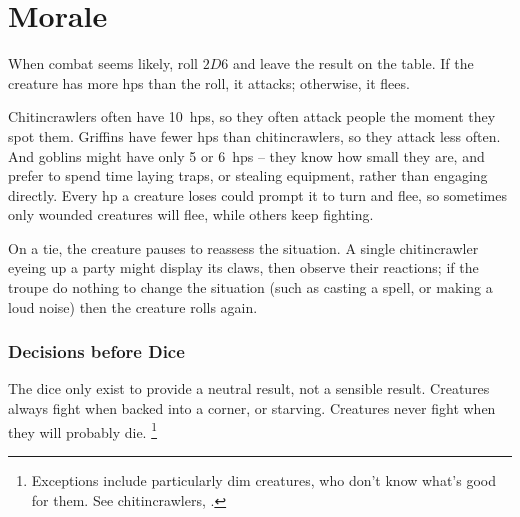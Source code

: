 \section{Morale}
\label{morale}
\begin{multicols}{2}

\noindent
When combat seems likely, roll $2D6$ and leave the result on the table.
If the creature has more \glspl{hp} than the roll, it attacks; otherwise, it flees.


Chitincrawlers often have 10~\glspl{hp}, so they often attack people the moment they spot them.
Griffins have fewer \glspl{hp} than chitincrawlers, so they attack less often.
And goblins might have only 5 or 6~\glspl{hp} -- they know how small they are, and prefer to spend time laying traps, or stealing equipment, rather than engaging directly.
Every \gls{hp} a creature loses could prompt it to turn and flee, so sometimes only wounded creatures will flee, while others keep fighting.

On a tie, the creature pauses to reassess the situation.
A single chitincrawler eyeing up a party might display its claws, then observe their reactions; if the troupe do nothing to change the situation (such as casting a spell, or making a loud noise) then the creature rolls again.

\subsubsection{Decisions before Dice}

The dice only exist to provide a neutral result, not a sensible result.
Creatures always fight when backed into a corner, or starving.
Creatures never fight when they will probably die.%
\footnote{Exceptions include particularly dim creatures, who don't know what's good for them.
See chitincrawlers, .}


\end{multicols}
